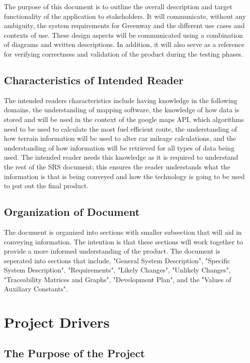 \documentclass[12pt]{article}
\begin{document}
The purpose of this document is to outline the overall description and target functionality
of the application to stakeholders. It will communicate, without any ambiguity, the system
requirements for Greenway and the different use cases and contexts of use. These design
aspects will be communicated using a combination of diagrams and written descriptions.
In addition, it will also serve as a reference for verifying correctness and validation of the
product during the testing phases.


\subsection{Characteristics of Intended Reader} \label{sec_IntendedReader}

The intended readers characteristics include having knowledge in the following domains, 
the understanding of mapping software, the knowledge of how data is stored and will be used
in the context of the google maps API, which algorithms need to be used to calculate the most
fuel efficient route, the understanding of how terrain information will be used to alter car mileage
calculations, and the understanding of how information will be retrieved for all types of data being used.
The intended reader needs this knowledge as it is required to understand the rest of the SRS document;
this ensures the reader understands what the information is that is being conveyed and how the technology
is going to be used to put out the final product.

\subsection{Organization of Document}

The document is organized into sections with smaller subsection that will aid in conveying information.
The intention is that these sections will work together to provide a more informed understanding of the product.
The document is seperated into sections that include, "General System Description", "Specific System Description", "Requirements",
"Likely Changes", "Unlikely Changes", "Traceability Matrices and Graphs", "Development Plan", and the "Values of Auxiliary Constants".

\section{Project Drivers}

\subsection{The Purpose of the Project}
\end{document}
